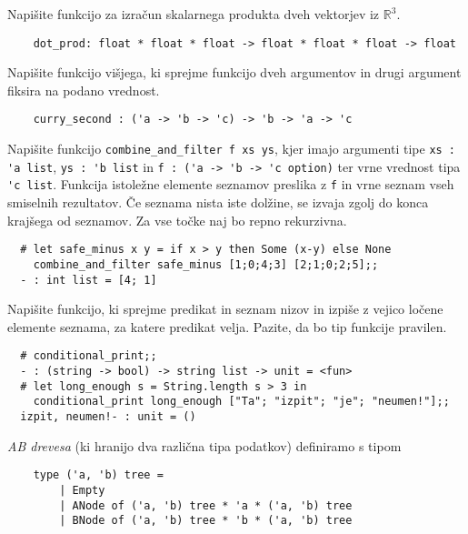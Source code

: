 \documentclass[arhiv]{../izpit}
\begin{document}
	
	

	\naloga 
  
	\podnaloga Napišite funkcijo za izračun skalarnega produkta dveh vektorjev iz $\mathbb{R}^3$.
  \begin{verbatim}
    dot_prod: float * float * float -> float * float * float -> float
  \end{verbatim}

  \podnaloga Napišite funkcijo višjega, ki sprejme funkcijo dveh argumentov in drugi argument fiksira na podano vrednost. 
  \begin{verbatim}
    curry_second : ('a -> 'b -> 'c) -> 'b -> 'a -> 'c
  \end{verbatim}

	\podnaloga Napišite funkcijo \verb|combine_and_filter f xs ys|, kjer imajo argumenti tipe \verb|xs : 'a list|, \verb|ys : 'b list| in \verb|f : ('a -> 'b -> 'c option)| ter vrne vrednost tipa \verb|'c list|. Funkcija istoležne elemente seznamov preslika z \verb|f| in vrne seznam vseh smiselnih rezultatov. Če seznama nista iste dolžine, se izvaja zgolj do konca krajšega od seznamov. Za vse točke naj bo repno rekurzivna.
	\begin{verbatim}
  # let safe_minus x y = if x > y then Some (x-y) else None
    combine_and_filter safe_minus [1;0;4;3] [2;1;0;2;5];;
  - : int list = [4; 1]
	\end{verbatim}
	
	\podnaloga Napišite funkcijo, ki sprejme predikat in seznam nizov in izpiše z vejico ločene elemente seznama, za katere predikat velja. Pazite, da bo tip funkcije pravilen.
  \begin{verbatim}
  # conditional_print;;
  - : (string -> bool) -> string list -> unit = <fun>
  # let long_enough s = String.length s > 3 in
    conditional_print long_enough ["Ta"; "izpit"; "je"; "neumen!"];;
  izpit, neumen!- : unit = ()
	\end{verbatim}
  
  \naloga
  
  \textit{AB drevesa} (ki hranijo dva različna tipa podatkov) definiramo s tipom
  	\begin{verbatim}
  	type ('a, 'b) tree = 
  		| Empty
  		| ANode of ('a, 'b) tree * 'a * ('a, 'b) tree
  		| BNode of ('a, 'b) tree * 'b * ('a, 'b) tree
  	\end{verbatim}
  
\end{document}
